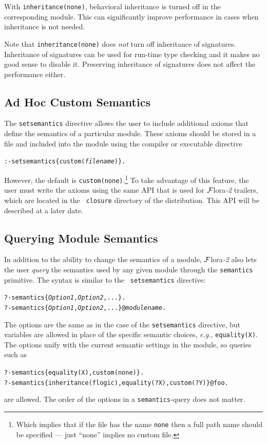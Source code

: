 \documentclass[11pt]{article}
\newcommand{\FLORA}{{\mbox{\sc ${\cal F}${lora}\rm\emph{-2}}}\xspace}
\begin{document}
With {\tt inheritance(none)}, behavioral inheritance is turned off in the
corresponding module.  This can significantly improve performance in cases
when inheritance is not needed.

Note that {\tt inheritance(none)} does \emph{not} turn off inheritance of
signatures. Inheritance of signatures can be used for run-time type checking
and it makes no good sense to disable it. Preserving inheritance of
signatures does not affect the performance either.

\subsection{Ad Hoc Custom Semantics}\label{sec-ad-hoc-semantics}

The {\tt setsemantics} directive allows the user to include additional axioms
that define the semantics of a particular module. These axioms should be
stored in a file and included into the module using the compiler or
executable directive
\begin{alltt}
   :- setsemantics\{custom(\emph{filename})\}.  
\end{alltt}
However, the default is  {\tt custom(none)}.\footnote{
  Which implies that if the file has the name {\tt none} then a full path
  name should be specified --- just ``none'' implies no custom file.
}
To take advantage of this feature, the user must write the axioms using the
same API that is used for \FLORA trailers, which are located in the {\tt
  closure} directory of the distribution. This API will be described at a
later date.

\subsection{Querying Module Semantics}\label{sec-query-semantics}

In addition to the ability to change the semantics of a module, \FLORA also
lets the user \emph{query} the semantics used by any given module through
the {\tt semantics} primitive. The syntax is similar to the {\tt
  setsemantics} directive:
\begin{alltt}
   ?- semantics\{{\em Option1}, {\em Option2}, ...\}. \\
   ?- semantics\{{\em Option1}, {\em Option2}, ...\}@\emph{modulename}.
\end{alltt}
The options are the same as in the case of the {\tt setsemantics}
directive, but variables are allowed in place of the specific semantic
choices, {\it e.g.}, {\tt equality(X)}. The options unify with the current
semantic settings in the module, so queries such as 
\begin{alltt}
   ?- semantics\{equality(X), custom(none)\}. \\
   ?- semantics\{inheritance(flogic), equality(?X), custom(?Y)\}@foo.
\end{alltt}
are allowed. The order of the options in a {\tt semantics}-query does not
matter.
\end{document}

